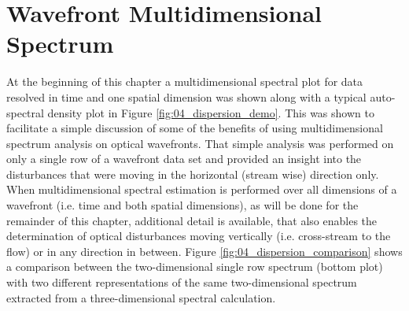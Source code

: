 \section{Wavefront Multidimensional Spectrum}
At the beginning of this chapter a multidimensional spectral plot for data resolved in time and one spatial dimension was shown along with a typical auto-spectral density plot in Figure \ref{fig:04_dispersion_demo}.
This was shown to facilitate a simple discussion of some of the benefits of using multidimensional spectrum analysis on optical wavefronts.
That simple analysis was performed on only a single row of a wavefront data set and provided an insight into the disturbances that were moving in the horizontal (stream wise) direction only.
When multidimensional spectral estimation is performed over all dimensions of a wavefront (i.e. time and both spatial dimensions), as will be done for the remainder of this chapter, additional detail is available, that also enables the determination of optical disturbances moving vertically (i.e. cross-stream to the flow) or in any direction in between.
Figure \ref{fig:04_dispersion_comparison} shows a comparison between the two-dimensional single row spectrum (bottom plot) with two different representations of the same two-dimensional spectrum extracted from a three-dimensional spectral calculation.
